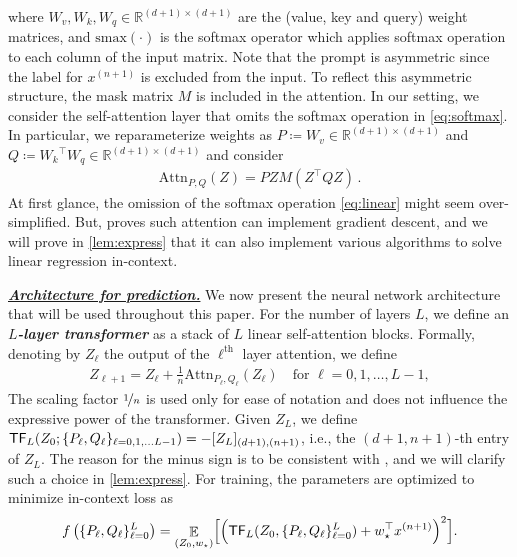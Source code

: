 \documentclass{article}
\DeclareMathOperator{\E}{\mathbb{E}}
\newcommand{\R}{\mathbb{R}}
\newcommand{\att}{\mathrm{Attn}}
\renewcommand{\aa}{M}
\newcommand{\wstar}{w_\star}
\newcommand{\tx}[1]{x^{(#1)}}
\newcommand{\NF}{{\sf TF}}
\newcommand{\emphh}[1]{\textbf{\emph{#1}}}
\begin{document}
where $W_v, W_k,W_q \in \R^{(d+1)\times (d+1)}$ are  the  (value, key and query) weight matrices, and $\mathrm{smax}(\cdot)$ is the softmax operator which applies softmax operation to each column of the input matrix. Note that the prompt is asymmetric since the label for $\tx{n+1}$ is excluded from the input. To reflect this asymmetric structure, the mask matrix $M$ is included in the attention.
In our setting, we consider the self-attention layer that omits the softmax operation in \eqref{eq:softmax}. In particular, we reparameterize weights as $P\coloneqq W_v\in \R^{(d+1)\times (d+1)}$ and  $Q  \coloneqq {W_k}^\top W_q \in \R^{(d+1)\times (d+1)}$ and consider  
\begin{align} \label{eq:linear}
\att_{P,Q}(Z) = P Z \aa (Z^\top Q Z) \,.
\end{align}  
At first glance, the omission of the softmax operation \eqref{eq:linear} might seem over-simplified. But, \citep{von2022transformers} proves such attention can implement gradient descent, and we will prove in \autoref{lem:express} that it can also implement various algorithms to solve linear regression in-context.

\underline{\emphh{Architecture for prediction.}}
We now present the neural network architecture that will be used throughout this paper.  For the number of layers $L$, we define an \emphh{$L$-layer transformer} as a stack of $L$ linear self-attention blocks. Formally, denoting by $Z_\ell$ the output of the $\ell^{\text{th}}$ layer attention, we define
\begin{align} \label{eq:recursion}
Z_{\ell+1} = Z_{\ell} +\frac{1}{n}  \att_{P_\ell,Q_\ell}(Z_\ell)\quad \text{for $\ell=0,1,\dots,L-1$},
\end{align}  
The scaling factor $\nicefrac{1}{n}$ is used only for ease of notation and does not influence the expressive power of the transformer.
Given $Z_L$, we define $\NF_L (Z_0; \{P_\ell,Q_\ell\}_{\ell=0,1,\dots L-1})  = -[Z_{L}]_{(d+1),(n+1)}$, i.e., the $(d+1,n+1)$-th entry of $Z_{L}$. 
The reason for the minus sign is to be consistent with \citep{von2022transformers}, and we will  clarify such a choice in \autoref{lem:express}. For training, the parameters are optimized to minimize in-context loss as 
\begin{align} \label{def:ICL linear}
f\left(\{P_\ell, Q_\ell\}^{L}_{\ell=0}\right) = \E_{(Z_0,\wstar)} \Bigl[ \left( \NF_L(Z_0, \{ P_\ell, Q_\ell \}_{\ell=0}^L)+ \wstar^\top \tx{n+1}  \right)^2\Bigr].
\end{align}  
\end{document}
